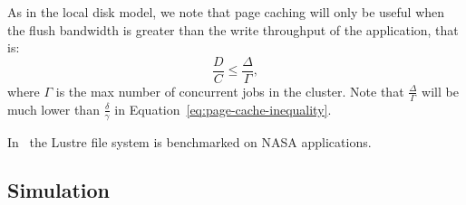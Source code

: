 \documentclass{IEEEtran}
\begin{document}
As in the local disk model, we note that page caching will only be 
useful when the flush bandwidth is greater than the write throughput of 
the application, that is:
\begin{equation}
\frac{D}{C} \leq \frac{\Delta}{\Gamma}, \label{eq:page-cache-sharedfs}
\end{equation}
where $\Gamma$ is the max number of concurrent jobs in the cluster. 
Note that $\frac{\Delta}{\Gamma}$ will be much lower than 
$\frac{\delta}{\gamma}$ in Equation~\ref{eq:page-cache-inequality}.     










In~\cite{saini2012performance} the Lustre file system is benchmarked on NASA applications. 

\subsection{Simulation} %

\end{document}
